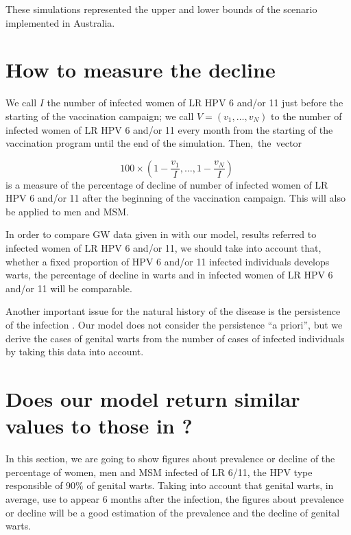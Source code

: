 These simulations represented the upper and lower bounds of the scenario implemented in Australia. 

\section{How to measure the decline}\label{sec:decline}%

We call $I$ the number of infected women of LR HPV 6 and/or 11 just before the starting of the vaccination campaign; we call $V = ( v_1, \ldots, v_N)$ to the number of infected women of LR HPV 6 and/or 11 every month from the starting of the vaccination program until the end of the simulation. Then,~the~vector 

\begin{equation}
100 \times \left( 1-\displaystyle\frac{v_1}{I}, \ldots, 1-\displaystyle\frac{v_N}{I} \right) \; 
\end{equation}
is a measure of the percentage of decline of number of infected women of LR HPV 6 and/or 11 after the beginning of the vaccination campaign. This will also be applied to men and MSM.

In order to compare GW data given in \cite{ali2013genital} with our model, results referred to infected women of LR HPV 6 and/or 11, we should take into account that, whether a fixed proportion of HPV 6 and/or 11 infected individuals develops warts, the percentage of decline in warts and in infected women of LR HPV 6 and/or 11 will be comparable. 

Another important issue for the natural history of the disease is the persistence of the infection \cite{campos2014updated}. Our model does not consider the persistence ``a priori'', but we derive the cases of genital warts from the number of cases of infected individuals by taking this data into account.



\section{Does our model return similar values to those in \cite{ali2013genital}?}
In this section, we are going to show figures about prevalence or decline of the percentage of women, men and MSM infected of LR 6/11, the HPV type responsible of $90\%$ of genital warts. Taking into account that genital warts, in average, use to appear 6 months after the infection, the figures about prevalence or decline will be a good estimation of the prevalence and the  decline of genital warts.  

